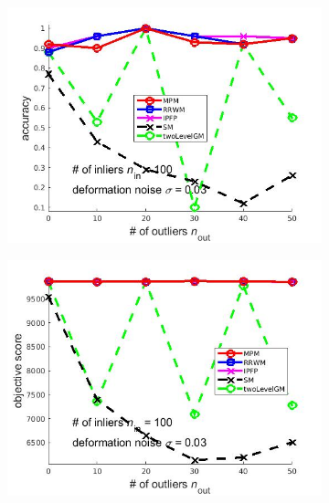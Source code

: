 \documentclass[
	fontsize=12pt,
	paper=a4,
	twoside=false,
	numbers=noenddot,
	plainheadsepline,
	toc=listof,
	toc=bibliography
]{scrartcl}
\begin{document}
\begin{figure}[ht] 
	\begin{subfigure}[b]{0.3\textwidth}
		\centering
		\includegraphics[scale=0.25]{"fig_ver2008/syntheticPointSets/outliertest_n50/accuracy_greedy"} 
	\end{subfigure}%
	\begin{subfigure}[b]{0.3\textwidth}
		\centering
		\includegraphics[scale=0.25]{"fig_ver2008/syntheticPointSets/outliertest_n50/score_greedy"} 
	\end{subfigure} 
	\begin{subfigure}[b]{0.3\textwidth}
		\centering

\end{subfigure}
\end{figure}
\end{document}
